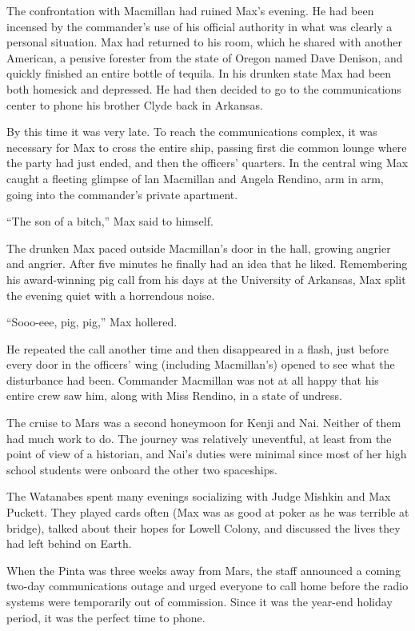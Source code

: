 \documentclass[]{article}
\begin{document}
{The confrontation with Macmillan had ruined Max’s evening. He had been incensed by the commander’s use of his official authority in what was clearly a personal situation. Max had returned to his room, which he shared with another American, a pensive forester from the state of Oregon named Dave Denison, and quickly finished an entire bottle of tequila. In his drunken state Max had been both homesick and depressed. He had then decided to go to the communications center to phone his brother Clyde back in Arkansas.

By this time it was very late. To reach the communications complex, it was necessary for Max to cross the entire ship, passing first die common lounge where the party had just ended, and then the officers’ quarters. In the central wing Max caught a fleeting glimpse of lan Macmillan and Angela Rendino, arm in arm, going into the commander’s private apartment.

“The son of a bitch,” Max said to himself.

The drunken Max paced outside Macmillan’s door in the hall, growing angrier and angrier. After five minutes he finally had an idea that he liked. Remembering his award-winning pig call from his days at the University of Arkansas, Max split the evening quiet with a horrendous noise.

“Sooo-eee, pig, pig,” Max hollered.

He repeated the call another time and then disappeared in a flash, just before every door in the officers’ wing (including Macmillan’s) opened to see what the disturbance had been. Commander Macmillan was not at all happy that his entire crew saw him, along with Miss Rendino, in a state of undress.

The cruise to Mars was a second honeymoon for Kenji and Nai. Neither of them had much work to do. The journey was relatively uneventful, at least from the point of view of a historian, and Nai’s duties were minimal since most of her high school students were onboard the other two spaceships.

The Watanabes spent many evenings socializing with Judge Mishkin and Max Puckett. They played cards often (Max was as good at poker as he was terrible at bridge), talked about their hopes for Lowell Colony, and discussed the lives they had left behind on Earth.

When the Pinta was three weeks away from Mars, the staff announced a coming two-day communications outage and urged everyone to call home before the radio systems were temporarily out of commission. Since it was the year-end holiday period, it was the perfect time to phone.

}
\end{document}
